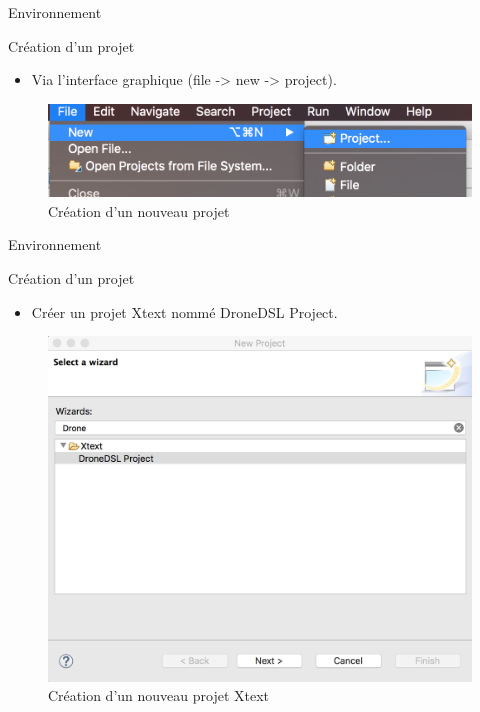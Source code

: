 \documentclass{bredelebeamer}
\begin{document}
\begin{frame}{Environnement}
\begin{block}{Création d'un projet}
\begin{itemize}
\item Via l'interface graphique (file -> new -> project).
\end{itemize}
\end{block}\pause
\begin{figure}
\centering
\includegraphics[scale=0.21]{images/04.png}
\caption{Création d'un nouveau projet}
\end{figure}
\end{frame}

\begin{frame}{Environnement}
\begin{block}{Création d'un projet}
\begin{itemize}
\item Créer un projet Xtext nommé DroneDSL Project.
\end{itemize}
\end{block}\pause
\begin{figure}
\centering
\includegraphics[scale=0.3]{images/05.png}
\caption{Création d'un nouveau projet Xtext}
\end{figure}
\end{frame}
\end{document}
